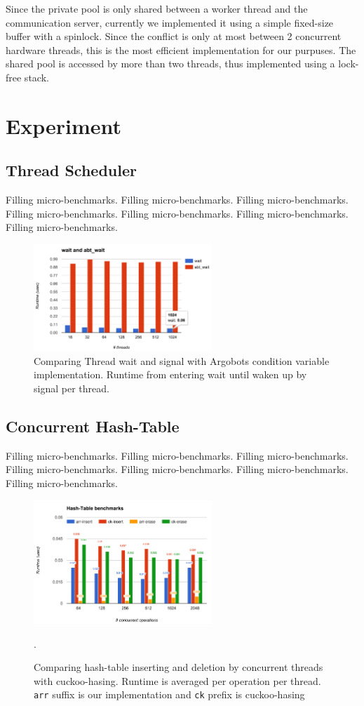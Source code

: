 \documentclass{sig-alternate-05-2015}
\begin{document}
Since the private pool is only shared between a worker thread and the
communication server, currently we implemented it using a simple fixed-size
buffer with a spinlock. Since the conflict is only at most between 2 concurrent
hardware threads, this is the most efficient implementation for our purpuses.
The shared pool is accessed by more than two threads, thus implemented using a
lock-free stack.

\section{Experiment}
\label{sec:exp}
\subsection{Thread Scheduler}
Filling micro-benchmarks.
Filling micro-benchmarks.
Filling micro-benchmarks.
Filling micro-benchmarks.
Filling micro-benchmarks.
Filling micro-benchmarks.
Filling micro-benchmarks.

\begin{figure}[h]
  \centering 
  \includegraphics[width=0.6\textwidth]{fig/thread.png}
  \caption{Comparing Thread wait and signal with Argobots condition variable
  implementation. Runtime from entering wait until waken up by signal per thread.}
\end{figure}

\subsection{Concurrent Hash-Table}
Filling micro-benchmarks.
Filling micro-benchmarks.
Filling micro-benchmarks.
Filling micro-benchmarks.
Filling micro-benchmarks.
Filling micro-benchmarks.
Filling micro-benchmarks.


\begin{figure}[h!]
  \centering 
  \includegraphics[width=0.6\textwidth]{fig/hashtbl.png}
  \caption{Comparing hash-table inserting and deletion by concurrent threads
    with cuckoo-hasing.  Runtime is averaged per operation per thread.
    \texttt{arr} suffix is our implementation and \texttt{ck} prefix is cuckoo-hasing}.
\end{figure}
\end{document}
